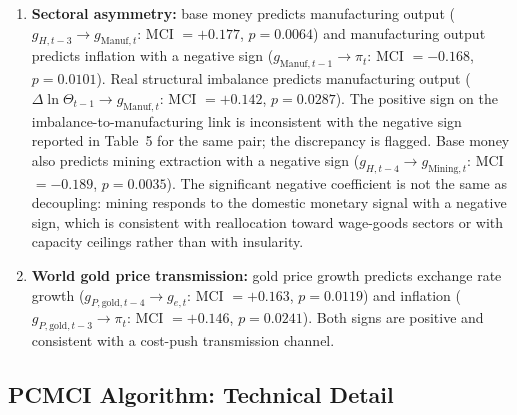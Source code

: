 \begin{enumerate}
	\item \textbf{Sectoral asymmetry:} base money predicts manufacturing output ($g_{H,t-3} \to g_{\text{Manuf},t}$: MCI $= +0.177$, $p = 0.0064$) and manufacturing output predicts inflation with a negative sign ($g_{\text{Manuf},t-1} \to \pi_t$: MCI $= -0.168$, $p = 0.0101$). Real structural imbalance predicts manufacturing output ($\Delta \ln \Theta_{t-1} \to g_{\text{Manuf},t}$: MCI $= +0.142$, $p = 0.0287$). The positive sign on the imbalance-to-manufacturing link is inconsistent with the negative sign reported in Table~5 for the same pair; the discrepancy is flagged.
	Base money also predicts mining extraction with a negative sign ($g_{H,t-4} \to g_{\text{Mining},t}$: MCI $= -0.189$, $p = 0.0035$). The significant negative coefficient is not the same as decoupling: mining responds to the domestic monetary signal with a negative sign, which is consistent with reallocation toward wage-goods sectors or with capacity ceilings rather than with insularity.
	\item \textbf{World gold price transmission:} gold price growth predicts exchange rate growth ($g_{P,\text{gold},t-4} \to g_{e,t}$: MCI $= +0.163$, $p = 0.0119$) and inflation ($g_{P,\text{gold},t-3} \to \pi_t$: MCI $= +0.146$, $p = 0.0241$). Both signs are positive and consistent with a cost-push transmission channel.
\end{enumerate}

\subsection*{PCMCI Algorithm: Technical Detail}

